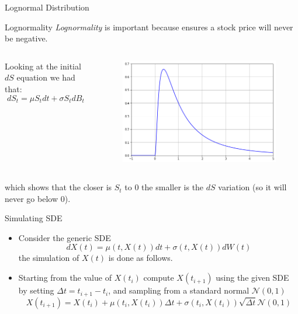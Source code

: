 \documentclass{beamer}
\begin{document}
\begin{frame}{Lognormal Distribution}
\begin{block}{Lognormality}
  \emph{Lognormality} is important because ensures a stock price will never be negative.
  \begin{columns}
Looking at the initial $dS$ equation we had that:
\begin{equation*}
dS_t = \mu S_tdt + \sigma S_tdB_t
\end{equation*}
\begin{figure}[h]
    \begin{center}
    \includegraphics[width=0.85\linewidth]{lognormal}
    \end{center}
\end{figure}        
\end{columns}
which shows that the closer is $S_t$ to 0 the smaller is the $dS$ variation (so it will never go below 0).
\end{block}
\end{frame}

\begin{frame}{Simulating SDE}
\begin{itemize}
\item  Consider the generic SDE
\begin{equation*}
dX(t) = \mu(t,X(t))dt + \sigma(t,X(t))dW(t)
\end{equation*}
the simulation of $X(t)$ is done as follows.
\item Starting from the value of $X(t_i)$ compute $X(t_{i+1})$ using the given SDE by setting $\Delta t = t_{i+1} - t_{i}$, and sampling from a standard normal $\mathcal{N}(0,1)$
\begin{equation*}
X(t_{i+1}) = X(t_i) + \mu(t_i,X(t_i))\Delta t + \sigma(t_i,X(t_i))\sqrt{\Delta t}\mathcal{N}(0,1)
\end{equation*}
\end{itemize}
\href{https://colab.research.google.com/drive/1cQbX7jWk4_pfrm72r3ZiZyDEpevP63z2?authuser=1\#scrollTo=1895fa54}{}
\end{frame}
\end{document}
